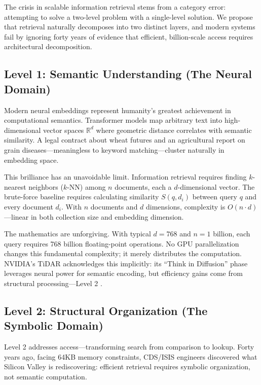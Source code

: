 \documentclass[manuscript,screen,nonacm]{acmart}
\begin{document}
The crisis in scalable information retrieval stems from a category error: attempting to solve a two-level problem with a single-level solution. We propose that retrieval naturally decomposes into two distinct layers, and modern systems fail by ignoring forty years of evidence that efficient, billion-scale access requires architectural decomposition.

\subsection{Level 1: Semantic Understanding (The Neural Domain)}

Modern neural embeddings represent humanity's greatest achievement in computational semantics. Transformer models map arbitrary text into high-dimensional vector spaces $\mathbb{R}^d$ where geometric distance correlates with semantic similarity. A legal contract about wheat futures and an agricultural report on grain diseases---meaningless to keyword matching---cluster naturally in embedding space.

This brilliance has an unavoidable limit. Information retrieval requires finding $k$-nearest neighbors ($k$-NN) among $n$ documents, each a $d$-dimensional vector. The brute-force baseline requires calculating similarity $S(q, d_i)$ between query $q$ and every document $d_i$. With $n$ documents and $d$ dimensions, complexity is $O(n \cdot d)$---linear in both collection size and embedding dimension.

The mathematics are unforgiving. With typical $d=768$ and $n=1$ billion, each query requires 768 billion floating-point operations. No GPU parallelization changes this fundamental complexity; it merely distributes the computation. NVIDIA's TiDAR acknowledges this implicitly: its ``Think in Diffusion'' phase leverages neural power for semantic encoding, but efficiency gains come from structural processing---Level 2 \cite{liu2024}.

\subsection{Level 2: Structural Organization (The Symbolic Domain)}

Level 2 addresses access---transforming search from comparison to lookup. Forty years ago, facing 64KB memory constraints, CDS/ISIS engineers discovered what Silicon Valley is rediscovering: efficient retrieval requires symbolic organization, not semantic computation.
\end{document}
